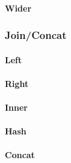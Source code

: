 \documentclass[]{article}
\let\oldparagraph\paragraph
\renewcommand{\paragraph}[1]{\oldparagraph{#1}\mbox{}}
\begin{document}
\paragraph{Wider}\label{wider}

\subsubsection{Join/Concat}\label{joinconcat}

\paragraph{Left}\label{left}

\paragraph{Right}\label{right}

\paragraph{Inner}\label{inner}

\paragraph{Hash}\label{hash}

\paragraph{Concat}\label{concat}
\end{document}

